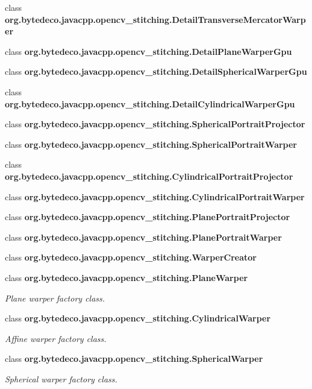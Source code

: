 \begin{DoxyCompactItemize}
\item 
class {\bfseries org.\+bytedeco.\+javacpp.\+opencv\+\_\+stitching.\+Detail\+Transverse\+Mercator\+Warper}
\item 
class {\bfseries org.\+bytedeco.\+javacpp.\+opencv\+\_\+stitching.\+Detail\+Plane\+Warper\+Gpu}
\item 
class {\bfseries org.\+bytedeco.\+javacpp.\+opencv\+\_\+stitching.\+Detail\+Spherical\+Warper\+Gpu}
\item 
class {\bfseries org.\+bytedeco.\+javacpp.\+opencv\+\_\+stitching.\+Detail\+Cylindrical\+Warper\+Gpu}
\item 
class {\bfseries org.\+bytedeco.\+javacpp.\+opencv\+\_\+stitching.\+Spherical\+Portrait\+Projector}
\item 
class {\bfseries org.\+bytedeco.\+javacpp.\+opencv\+\_\+stitching.\+Spherical\+Portrait\+Warper}
\item 
class {\bfseries org.\+bytedeco.\+javacpp.\+opencv\+\_\+stitching.\+Cylindrical\+Portrait\+Projector}
\item 
class {\bfseries org.\+bytedeco.\+javacpp.\+opencv\+\_\+stitching.\+Cylindrical\+Portrait\+Warper}
\item 
class {\bfseries org.\+bytedeco.\+javacpp.\+opencv\+\_\+stitching.\+Plane\+Portrait\+Projector}
\item 
class {\bfseries org.\+bytedeco.\+javacpp.\+opencv\+\_\+stitching.\+Plane\+Portrait\+Warper}
\item 
class {\bfseries org.\+bytedeco.\+javacpp.\+opencv\+\_\+stitching.\+Warper\+Creator}
\item 
class {\bfseries org.\+bytedeco.\+javacpp.\+opencv\+\_\+stitching.\+Plane\+Warper}
\begin{DoxyCompactList}\small\item\em Plane warper factory class. \end{DoxyCompactList}\item 
class {\bfseries org.\+bytedeco.\+javacpp.\+opencv\+\_\+stitching.\+Cylindrical\+Warper}
\begin{DoxyCompactList}\small\item\em Affine warper factory class. \end{DoxyCompactList}\item 
class {\bfseries org.\+bytedeco.\+javacpp.\+opencv\+\_\+stitching.\+Spherical\+Warper}
\begin{DoxyCompactList}\small\item\em Spherical warper factory class. \end{DoxyCompactList}\item 

\end{DoxyCompactItemize}
